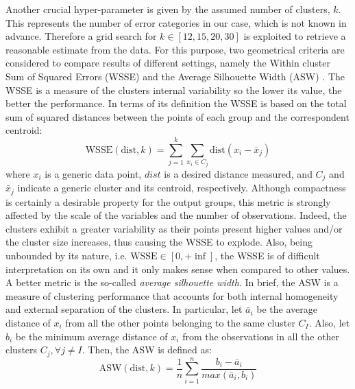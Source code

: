 Another crucial hyper-parameter is given by the assumed number of clusters, $k$. This represents the number of error categories in our case, which is not known in advance. 
Therefore a grid search for $k \in [12, 15, 20, 30] $ is exploited to retrieve a reasonable estimate from the data.
For this purpose, two geometrical criteria are considered to compare results of different settings, namely the Within cluster Sum of Squared Errors (WSSE) and the Average Silhouette Width (ASW) \cite{rousseeuw1987ASW}.
The WSSE is a measure of the clusters internal variability so the lower its value, the better the performance.
In terms of its definition the WSSE is based on the total sum of squared distances between the points of each group and the correspondent centroid:
\begin{equation}
    \text{WSSE}\left(\text{dist}, k\right) = 
    \sum_{j=1}^{k}{ 
    \sum_{x_i \in C_j}{\text{dist}\left( x_i - \bar{x}_j\right)} 
    }
\end{equation}
where $x_i$ is a generic data point, ${dist}$ is a desired distance measured, and $C_j$ and $\bar{x}_j$ indicate a generic cluster and its centroid, respectively.
Although compactness is certainly a desirable property for the output groups, this metric is strongly affected by the scale of the variables and the number of observations. Indeed, the clusters exhibit a greater variability as their points present higher values and/or the cluster size increases, thus causing the WSSE to explode. 
Also, being unbounded by its nature, i.e. $\text{WSSE} \in \left[ 0, +\inf \right]$, the WSSE is of difficult interpretation on its own and it only makes sense when compared to other values. \\
A better metric is the so-called \textit{average silhouette width}. In brief, the ASW is a measure of clustering performance that accounts for both internal homogeneity and external separation of the clusters.
In particular, let $\bar{a}_i$ be the average distance of $x_i$ from all the other points belonging to the same cluster $C_I$. Also, let $b_i$ be the minimum average distance of $x_i$ from the observations in all the other clusters $C_j , \forall j \neq I$. Then, the ASW is defined as:
\begin{equation}
    \text{ASW}\left(\text{dist}, k\right) = 
    \dfrac{1}{n} \sum_{i=1}^{n}{ 
    \dfrac{b_i - \bar{a}_i}{ max\left( \bar{a}_i, b_i \right) }
    }
\end{equation}
